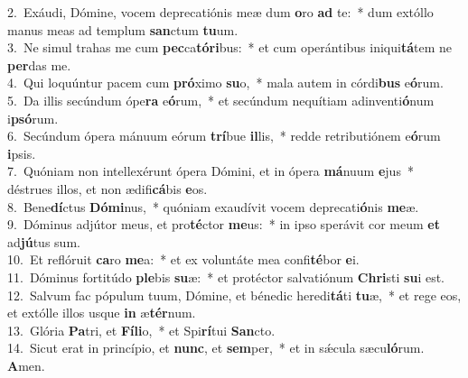 {2.~}Exáudi, Dómine, vocem deprecatiónis meæ dum \textbf{o}ro \textbf{ad} te:~* dum extóllo manus meas ad templum \textbf{san}ctum \textbf{tu}um.\\
{3.~}Ne simul trahas me cum \textbf{pec}ca\textbf{tó}\textbf{ri}bus:~* et cum operántibus iniqui\textbf{tá}tem ne \textbf{per}das me.\\
{4.~}Qui loquúntur pacem cum \textbf{pró}ximo \textbf{su}o,~* mala autem in córdi\textbf{bus} e\textbf{ó}rum.\\
{5.~}Da illis secúndum ópe\textbf{ra} e\textbf{ó}rum,~* et secúndum nequítiam adinventi\textbf{ó}num i\textbf{psó}rum.\\
{6.~}Secúndum ópera mánuum eórum \textbf{trí}bue \textbf{il}lis,~* redde retributiónem e\textbf{ó}rum \textbf{i}psis.\\
{7.~}Quóniam non intellexérunt ópera Dómini, et in ópera \textbf{má}nuum \textbf{e}jus~* déstrues illos, et non ædifi\textbf{cá}bis \textbf{e}os.\\
{8.~}Bene\textbf{dí}ctus \textbf{Dó}\textbf{mi}nus,~* quóniam exaudívit vocem deprecati\textbf{ó}nis \textbf{me}æ.\\
{9.~}Dóminus adjútor meus, et pro\textbf{té}ctor \textbf{me}us:~* in ipso sperávit cor meum \textbf{et} ad\textbf{jú}tus sum.\\
{10.~}Et reflóruit \textbf{ca}ro \textbf{me}a:~* et ex voluntáte mea confi\textbf{té}bor \textbf{e}i.\\
{11.~}Dóminus fortitúdo \textbf{ple}bis \textbf{su}æ:~* et protéctor salvatiónum \textbf{Chri}sti \textbf{su}i est.\\
{12.~}Salvum fac pópulum tuum, Dómine, et bénedic heredi\textbf{tá}ti \textbf{tu}æ,~* et rege eos, et extólle illos usque \textbf{in} æ\textbf{tér}num.\\
{13.~}Glória \textbf{Pa}tri, et \textbf{Fí}\textbf{li}o,~* et Spi\textbf{rí}tui \textbf{San}cto.\\
{14.~}Sicut erat in princípio, et \textbf{nunc}, et \textbf{sem}per,~* et in sǽcula sæcu\textbf{ló}rum. \textbf{A}men.\\
